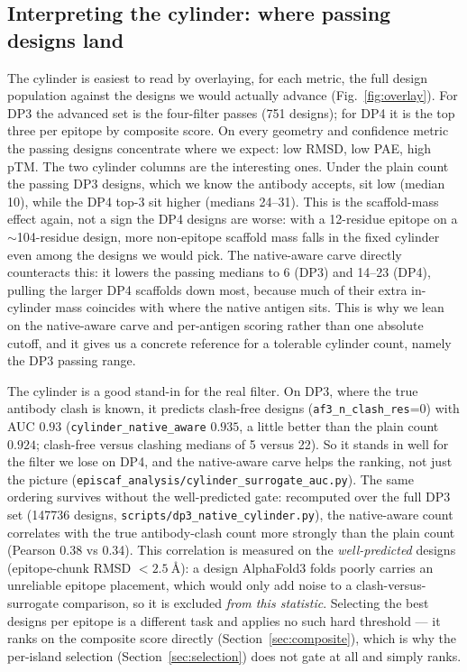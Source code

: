 \subsection{Interpreting the cylinder: where passing designs land}\label{sec:cylinterp}
The cylinder is easiest to read by overlaying, for each metric, the full design population
against the designs we would actually advance (Fig.~\ref{fig:overlay}). For DP3 the advanced
set is the four-filter passes (\num{751} designs); for DP4 it is the top three per epitope by
composite score. On every geometry and confidence metric the passing designs concentrate
where we expect: low RMSD, low PAE, high pTM. The two cylinder columns are the interesting ones. Under the
plain count the passing DP3 designs, which we know the antibody accepts, sit low (median 10),
while the DP4 top-3 sit higher (medians 24--31). This is the scaffold-mass
effect again, not a sign the DP4 designs are worse: with a 12-residue epitope on a
$\sim$104-residue design, more non-epitope scaffold mass falls in the fixed cylinder even
among the designs we would pick. The native-aware carve directly counteracts this: it lowers
the passing medians to 6 (DP3) and 14--23 (DP4), pulling the larger DP4 scaffolds down most,
because much of their extra in-cylinder mass coincides with where the native antigen sits.
This is why we lean on the native-aware carve and per-antigen
scoring rather than one absolute cutoff, and it gives us a concrete reference for a tolerable
cylinder count, namely the DP3 passing range.

The cylinder is a good stand-in for the real filter. On DP3, where the true antibody clash is
known, it predicts clash-free designs (\texttt{af3\_n\_clash\_res}=0) with AUC $0.93$
(\texttt{cylinder\_native\_aware} $0.935$, a little better than the plain count $0.924$;
clash-free versus clashing medians of 5 versus 22). So it stands in well for the filter we
lose on DP4, and the native-aware carve helps the ranking, not just the picture
(\texttt{episcaf\_analysis/cylinder\_surrogate\_auc.py}). The same ordering survives without
the well-predicted gate: recomputed over the full DP3 set (\num{147736} designs,
\texttt{scripts/dp3\_native\_cylinder.py}), the native-aware count correlates with the true
antibody-clash count more strongly than the plain count (Pearson \num{0.38} vs \num{0.34}). This correlation is measured on the
\emph{well-predicted} designs (epitope-chunk RMSD $< \SI{2.5}{\angstrom}$): a design AlphaFold3
folds poorly carries an unreliable epitope placement, which would only add noise to a
clash-versus-surrogate comparison, so it is excluded \emph{from this statistic}. Selecting the
best designs per epitope is a different task and applies no such hard threshold --- it ranks on
the composite score directly (Section~\ref{sec:composite}), which is why the per-island
selection (Section~\ref{sec:selection}) does not gate at all and simply ranks.

